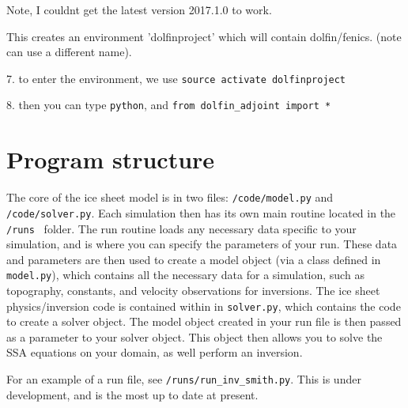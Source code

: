 \documentclass[11pt, reqno, nocenter]{article}
\begin{document}
Note, I couldnt get the latest version 2017.1.0 to work. 

This creates an environment 'dolfinproject' which will contain dolfin/fenics. (note can use a different name).

7. to enter the environment, we use
\verb!source activate dolfinproject!


8. then you can type \verb!python!, and \verb!from dolfin_adjoint import *!


\section{Program structure}

The core of the ice sheet model is in two files: {\tt /code/model.py} and {\tt /code/solver.py}. Each simulation then has its own main routine located in the {\tt /runs } folder. The run routine loads any necessary data specific to your simulation, and is where you can specify the parameters of your run. These data and parameters are then used to create a model object (via a class defined in {\tt model.py}), which contains all the necessary data for a simulation, such as topography, constants, and velocity observations for inversions. The ice sheet physics/inversion code is contained within in {\tt solver.py}, which contains the code to create a solver object. The model object created in your run file is then passed as a parameter to your solver object. This object then allows you to solve the SSA equations on your domain, as well perform an inversion. 

For an example of a run file, see {\tt /runs/run\_inv\_smith.py}. This is under development, and is the most up to date at present.
\end{document}

